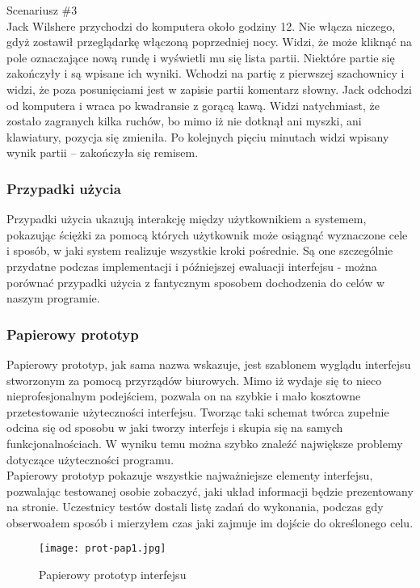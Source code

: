 \documentclass[12pt,leqno]{article}
\begin{document}
{\Large Scenariusz \#3}\\
	Jack Wilshere przychodzi do komputera około godziny 12. Nie włącza niczego, gdyż zostawił przeglądarkę włączoną poprzedniej nocy. Widzi, że może kliknąć na pole oznaczające nową rundę i wyświetli mu się lista partii. Niektóre partie się zakończyły i są wpisane ich wyniki. Wchodzi na partię z pierwszej szachownicy i widzi, że poza posunięciami jest w zapisie partii komentarz słowny. Jack odchodzi od komputera i wraca po kwadransie z gorącą kawą. Widzi natychmiast, że zostało zagranych kilka ruchów, bo mimo iż nie dotknął ani myszki, ani klawiatury, pozycja się zmieniła. Po kolejnych pięciu minutach widzi wpisany wynik partii – zakończyła się remisem.  
\\

\subsubsection{Przypadki użycia}
Przypadki użycia ukazują interakcję między użytkownikiem a systemem, pokazując ściężki za pomocą których użytkownik może osiągnąć wyznaczone cele i sposób, w jaki system realizuje wszystkie kroki pośrednie. Są one szczególnie przydatne podczas implementacji i późniejszej ewaluacji interfejsu - można porównać przypadki użycia z fantycznym sposobem dochodzenia do celów w naszym programie. 

\subsubsection{Papierowy prototyp}
Papierowy prototyp, jak sama nazwa wskazuje, jest szablonem wyglądu interfejsu stworzonym za pomocą przyrządów biurowych. Mimo iż wydaje się to nieco nieprofesjonalnym podejściem, pozwala on na szybkie i mało kosztowne przetestowanie użyteczności interfejsu. Tworząc taki schemat twórca zupełnie odcina się od sposobu w jaki tworzy interfejs i skupia się na samych funkcjonalnościach. W wyniku temu można szybko znaleźć największe problemy dotyczące użyteczności programu. \\ 
Papierowy prototyp pokazuje wszystkie najważniejsze elementy interfejsu, pozwalając testowanej osobie zobaczyć, jaki układ informacji będzie prezentowany na stronie. Uczestnicy testów dostali listę zadań do wykonania, podczas gdy obserwoałem sposób i mierzyłem czas jaki zajmuje im dojście do określonego celu.

\begin{figure}
\texttt{[image: prot-pap1.jpg]} 
\caption{Papierowy prototyp interfejsu}
\end{figure}
\end{document}
